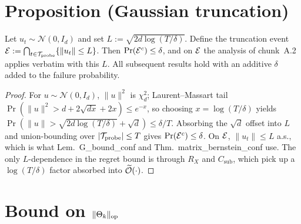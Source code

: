 \section*{Proposition (Gaussian truncation)}

\begin{proposition}
\label{prop:truncation}
Let $u_t\sim\mathcal N(0,I_d)$ and set $L := \sqrt{2d\log(T/\delta)}$.
Define the truncation event $\mathcal{E} := \bigcap_{t\in\mathcal{T}_{\mathrm{probe}}}\{\|u_t\|\le L\}$.
Then $\Pr(\mathcal{E}^c)\le\delta$, and on $\mathcal{E}$ the analysis of chunk~A.2
applies verbatim with this $L$. All subsequent results hold with an
additive $\delta$ added to the failure probability.
\end{proposition}
\begin{proof}
For $u\sim\mathcal N(0,I_d)$, $\|u\|^2$ is $\chi^2_d$; Laurent--Massart
tail $\Pr(\|u\|^2 > d + 2\sqrt{dx} + 2x)\le e^{-x}$, so choosing
$x = \log(T/\delta)$ yields $\Pr(\|u\|>\sqrt{2d\log(T/\delta)}+\sqrt d)\le\delta/T$.
Absorbing the $\sqrt d$ offset into $L$ and union-bounding over $|\mathcal{T}_{\mathrm{probe}}|\le T$
gives $\Pr(\mathcal{E}^c)\le\delta$. On $\mathcal{E}$, $\|u_t\|\le L$ a.s., which is
what Lem.\ G\_bound\_conf and Thm.\ matrix\_bernstein\_conf use. The
only $L$-dependence in the regret bound is through $R_X$ and
$C_{\mathrm{sub}}$, which pick up a $\log(T/\delta)$ factor absorbed
into $\widetilde{\mathcal{O}}(\cdot)$.
\end{proof}

\section*{Bound on $\|\Theta_k\|_{\mathrm{op}}$}

